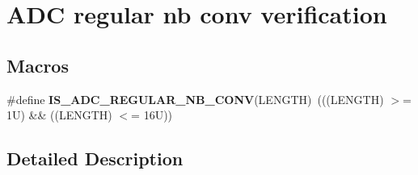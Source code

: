 \hypertarget{group___a_d_c__regular__nb__conv__verification}{}\section{A\+DC regular nb conv verification}
\label{group___a_d_c__regular__nb__conv__verification}
\subsection*{Macros}
\begin{DoxyCompactItemize}
\item 
\mbox{\label{group___a_d_c__regular__nb__conv__verification_ga81fb7f617e88ad4d86c25f040dcbc12f}} 
\#define {\bfseries I\+S\+\_\+\+A\+D\+C\+\_\+\+R\+E\+G\+U\+L\+A\+R\+\_\+\+N\+B\+\_\+\+C\+O\+NV}(L\+E\+N\+G\+TH)~(((L\+E\+N\+G\+TH) $>$= 1\+U) \&\& ((\+L\+E\+N\+G\+T\+H) $<$= 16\+U))
\end{DoxyCompactItemize}


\subsection{Detailed Description}
